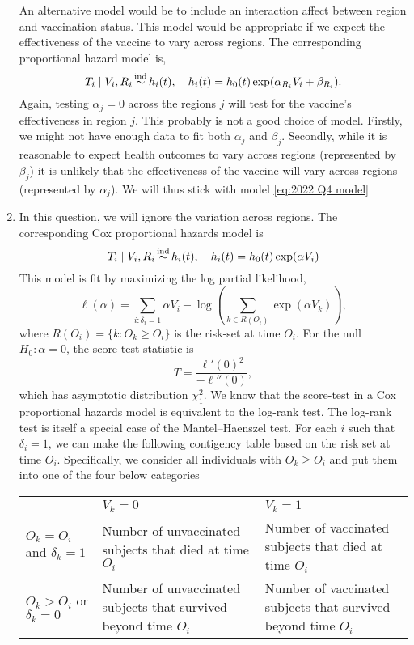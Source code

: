 \begin{enumerate}[label=(\alph*)]
    An alternative model would be to include an interaction affect between region and vaccination status. This model would be appropriate if we expect the effectiveness of the vaccine to vary across regions. The corresponding proportional hazard model is,
    \[T_i \mid V_i,R_i \simind h_i(t), \quad h_i(t)=h_0(t)\exp(\alpha_{R_i} V_i + \beta_{R_i}). \]
    Again, testing $\alpha_j=0$ across the regions $j$ will test for the vaccine's effectiveness in region $j$. This probably is not a good choice of model. Firstly, we might not have enough data to fit both $\alpha_j$ and $\beta_j$. Secondly, while it is reasonable to expect health outcomes to vary across regions (represented by $\beta_j$) it is unlikely that the effectiveness of the vaccine will vary across regions (represented by $\alpha_j$). We will thus stick with model \eqref{eq:2022 Q4 model}
    \item In this question, we will ignore the variation across regions. The corresponding Cox proportional hazards model is
    \[T_i \mid V_i,R_i \simind h_i(t), \quad h_i(t)=h_0(t)\exp(\alpha V_i) \]
    This model is fit by maximizing the log partial likelihood,
    \begin{equation}\label{eq:2022 Q4 partial}\ell(\alpha) = \sum_{i:\delta_i=1} \alpha V_i - \log\left(\sum_{k \in R(O_i)} \exp(\alpha V_k)\right), \end{equation}
    where $R(O_i) = \{k : O_k \ge O_i\}$ is the risk-set at time $O_i$. For the null $H_0:\alpha = 0$, the score-test statistic is
    \[T = \frac{\ell'(0)^2}{-\ell''(0)}, \]
    which has asymptotic distribution $\chi^2_1$. We know that the score-test in a Cox proportional hazards model is equivalent to the log-rank test. The log-rank test is itself a special case of the Mantel--Haenszel test. For each $i$ such that $\delta_i=1$, we can make the following contigency table based on the risk set at time $O_i$. Specifically, we consider all individuals with $O_k \ge O_i$ and put them into one of the four below categories
    \begin{table}[h]
        \begin{center}
        \begin{tabular}{|p{2.5cm}|p{5cm}|p{5cm}|}
            \hline
         &$V_k=0$ & $V_k=1$ \\
         \hline 
        $O_k=O_i$ and $\delta_k=1$ & Number of unvaccinated subjects that died at time $O_i$ & Number of vaccinated subjects that died at time $O_i$\\ 
        \hline 
        $O_k > O_i$ or $\delta_k = 0$& Number of unvaccinated subjects that survived beyond time $O_i$ & Number of vaccinated subjects that survived beyond time $O_i$ \\

\end{tabular}
\end{center}
\end{table}
\end{enumerate}
